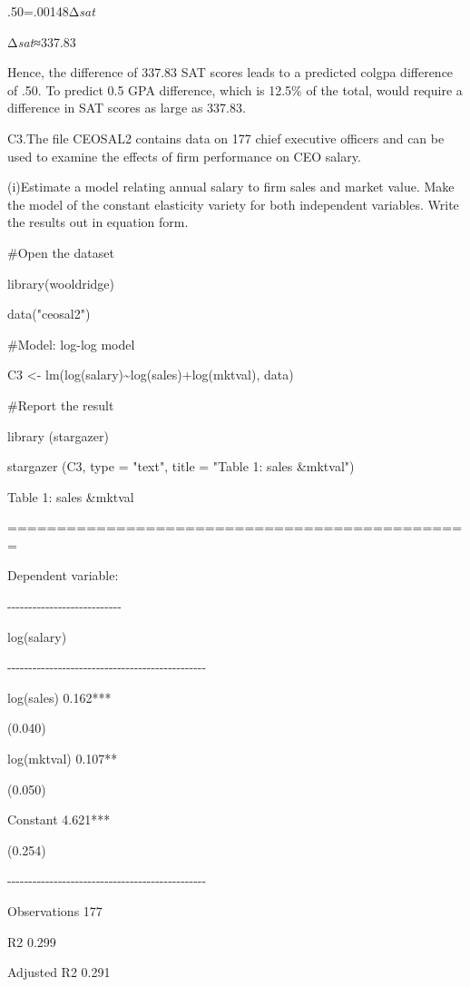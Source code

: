 \documentclass[
]{article}
\begin{document}
.50=.00148Δ\emph{sat}

Δ\emph{sat}≈337.83

Hence, the difference of 337.83 SAT scores leads to a predicted colgpa
difference of .50. To predict 0.5 GPA difference, which is 12.5\% of the
total, would require a difference in SAT scores as large as 337.83.

C3.The file CEOSAL2 contains data on 177 chief executive officers and
can be used to examine the effects of firm performance on CEO salary.

(i)Estimate a model relating annual salary to firm sales and market
value. Make the model of the constant elasticity variety for both
independent variables. Write the results out in equation form.

\#Open the dataset

library(wooldridge)

data("ceosal2")

\#Model: log-log model

C3 \textless- lm(log(salary)\textasciitilde log(sales)+log(mktval),
data)

\#Report the result

library (stargazer)

stargazer (C3, type = "text", title = "Table 1: sales \&mktval")

Table 1: sales \&mktval

===============================================

Dependent variable:

-\/-\/-\/-\/-\/-\/-\/-\/-\/-\/-\/-\/-\/-\/-\/-\/-\/-\/-\/-\/-\/-\/-\/-\/-\/-\/-

log(salary)

-\/-\/-\/-\/-\/-\/-\/-\/-\/-\/-\/-\/-\/-\/-\/-\/-\/-\/-\/-\/-\/-\/-\/-\/-\/-\/-\/-\/-\/-\/-\/-\/-\/-\/-\/-\/-\/-\/-\/-\/-\/-\/-\/-\/-\/-\/-

log(sales) 0.162***

(0.040)

log(mktval) 0.107**

(0.050)

Constant 4.621***

(0.254)

-\/-\/-\/-\/-\/-\/-\/-\/-\/-\/-\/-\/-\/-\/-\/-\/-\/-\/-\/-\/-\/-\/-\/-\/-\/-\/-\/-\/-\/-\/-\/-\/-\/-\/-\/-\/-\/-\/-\/-\/-\/-\/-\/-\/-\/-\/-

Observations 177

R2 0.299

Adjusted R2 0.291
\end{document}
